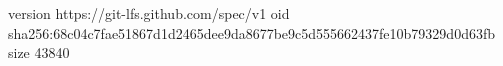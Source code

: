 version https://git-lfs.github.com/spec/v1
oid sha256:68c04c7fae51867d1d2465dee9da8677be9c5d555662437fe10b79329d0d63fb
size 43840
